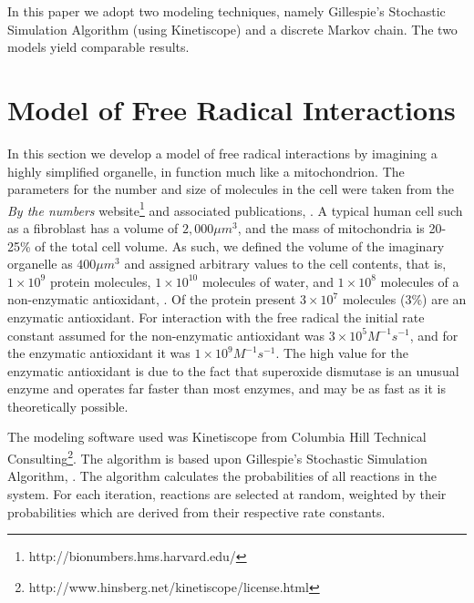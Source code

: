 \documentclass[preprint,12pt,authoryear]{elsarticle}
\begin{document}
In this paper we adopt two modeling techniques, namely Gillespie's Stochastic Simulation Algorithm
(using Kinetiscope) and a discrete Markov chain. The two models yield comparable results.


\section{Model of Free Radical Interactions}

In this section we develop a model of free radical interactions 
by imagining a highly simplified organelle, in function much like a
mitochondrion. The parameters for the number and size of molecules in the cell were taken from
the \emph{By the numbers} website\footnote{http://bionumbers.hms.harvard.edu/}
and associated publications, \citet{Milo:2015uq}. A typical human cell such as a fibroblast has a volume of $2,000 \mu m^3$, and the mass of mitochondria is 20-25\% of the total cell volume.
As such, we defined the volume of the imaginary organelle as $400 \mu m^3$ and assigned arbitrary values to the cell 
contents, that is, $1 \times 10^9$ protein molecules, $1 \times 10^{10}$
molecules of water, and $1 \times 10^8$ molecules of a non-enzymatic antioxidant, \citet{barevan:1989}.
Of the protein present $3 \times 10^7$ molecules (3\%) are an enzymatic antioxidant.
For interaction with the free radical the initial rate constant assumed for the non-enzymatic antioxidant was
$3 \times 10^5 M^{-1} s^{-1}$, and for the enzymatic antioxidant it was $1 \times 10^ 9 M^{-1} s^{-1}$. 
The high value for the enzymatic antioxidant is due to the fact that superoxide dismutase is an unusual enzyme and operates far faster than most enzymes, and may be as fast as it is theoretically possible.


The  modeling software used was Kinetiscope from Columbia Hill Technical
Consulting\footnote{http://www.hinsberg.net/kinetiscope/license.html}. 
The algorithm is based upon Gillespie's Stochastic Simulation Algorithm,  \citet{Gillespie:2007bx}. 
The algorithm calculates the probabilities of all reactions in the system. 
For each iteration, reactions are selected at random, weighted by their probabilities which are 
derived from their respective rate constants.
\end{document}
